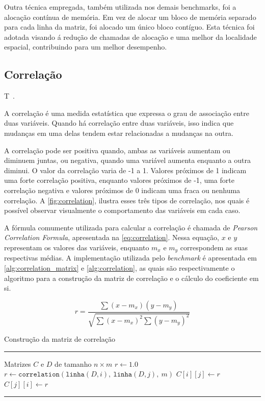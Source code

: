 Outra técnica empregada, também utilizada nos demais benchmarks, foi a alocação contínua de memória. Em vez de alocar um bloco de memória separado para cada linha da matriz, foi alocado um único bloco contíguo. Esta técnica foi adotada visando á redução de chamadas de alocação e uma melhor da localidade espacial, contribuindo para um melhor desempenho.

\subsection{Correlação}\label{subsec:correlation}

T~\cite{morettin2010}.

A correlação é uma medida estatística que expressa o grau de associação entre duas variáveis. Quando há correlação entre duas variáveis, isso indica que mudanças em uma delas tendem estar relacionadas a mudanças na outra.

A correlação pode ser positiva quando, ambas as variáveis aumentam ou diminuem juntas, ou negativa, quando uma variável aumenta enquanto a outra diminui. O valor da correlação varia de -1 a 1. Valores próximos de 1 indicam uma forte correlação positiva, enquanto valores próximos de -1, uma forte correlação negativa e valores próximos de 0 indicam uma fraca ou nenhuma correlação. A \autoref{fig:correlation}, ilustra esses três tipos de correlação, nos quais é possível observar visualmente o comportamento das variáveis em cada caso.

A fórmula comumente utilizada para calcular a correlação é chamada de \textit{Pearson Correlation Formula}, apresentada na \autoref{eq:correlation}. Nessa equação, $x$ e $y$ representam os valores das variáveis, enquanto $m_x$ e $m_y$ correspondem as suas respectivas médias. A implementação utilizada pelo \textit{benchmark} é apresentada em \autoref{alg:correlation_matrix} e \autoref{alg:correlation}, as quais são respectivamente o algoritmo para a construção da matriz de correlação e o cálculo do coeficiente em si.

\begin{equation}
	\label{eq:correlation}
	r = \frac{\sum(x - m_x)(y - m_y)}{\sqrt{\sum(x-m_x)^2 \sum(y - m_y)^2}}
\end{equation}

\begin{algorithm}[htb]
	\caption{Construção da matriz de correlação}
	\label{alg:correlation_matrix}
	\hrule
	\begin{algorithmic}[1]
		\REQUIRE Matrizes $C$ e $D$ de tamanho $n \times m$
		\STATE $r \gets 1.0$
		\ELSE
		\STATE $r \gets \texttt{correlation}(\texttt{linha}(D, i),\ \texttt{linha}(D, j),\ m)$
		\ENDIF
		\STATE $C[i][j] \gets r$
		\STATE $C[j][i] \gets r$
		\ENDFOR
		\ENDFOR
	\end{algorithmic}
	\hrule
	\fonte{}
\end{algorithm}

